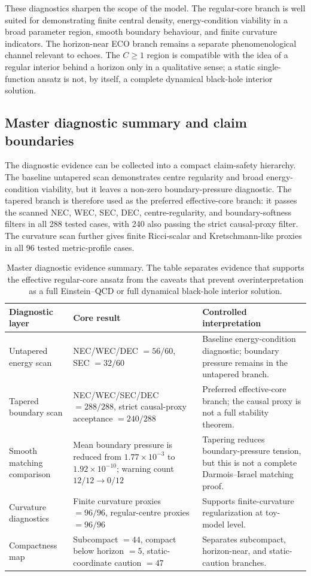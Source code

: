 \documentclass[epj]{svjour}
\begin{document}
These diagnostics sharpen the scope of the model. The regular-core branch is
well suited for demonstrating finite central density, energy-condition viability
in a broad parameter region, smooth boundary behaviour, and finite curvature
indicators. The horizon-near ECO branch remains a separate phenomenological
channel relevant to echoes. The $C\geq1$ region is compatible with the idea of a
regular interior behind a horizon only in a qualitative sense; a static
single-function ansatz is not, by itself, a complete dynamical black-hole
interior solution.


\subsection{Master diagnostic summary and claim boundaries}
\label{sec:master_diagnostic_summary}

The diagnostic evidence can be collected into a compact claim-safety hierarchy.
The baseline untapered scan demonstrates centre regularity and broad
energy-condition viability, but it leaves a non-zero boundary-pressure diagnostic.
The tapered branch is therefore used as the preferred effective-core branch: it
passes the scanned NEC, WEC, SEC, DEC, centre-regularity, and boundary-softness
filters in all 288 tested cases, with 240 also passing the strict causal-proxy
filter. The curvature scan further gives finite Ricci-scalar and
Kretschmann-like proxies in all 96 tested metric-profile cases.

\begin{table}
\centering
\caption{Master diagnostic evidence summary. The table separates evidence that
supports the effective regular-core ansatz from the caveats that prevent
overinterpretation as a full Einstein--QCD or full dynamical black-hole interior
solution.}
\label{tab:master_diagnostic_evidence}
\scriptsize
\begin{tabular}{p{}p{}p{}}
\toprule
Diagnostic layer & Core result & Controlled interpretation\\
\midrule
Untapered energy scan &
NEC/WEC/DEC $=56/60$, SEC $=32/60$ &
Baseline energy-condition diagnostic; boundary pressure remains in the
untapered branch.\\
Tapered boundary scan &
NEC/WEC/SEC/DEC $=288/288$, strict causal-proxy acceptance $=240/288$ &
Preferred effective-core branch; the causal proxy is not a full stability
theorem.\\
Smooth matching comparison &
Mean boundary pressure is reduced from $1.77\times10^{-3}$ to
$1.92\times10^{-10}$; warning count $12/12\to0/12$ &
Tapering reduces boundary-pressure tension, but this is not a complete
Darmois--Israel matching proof.\\
Curvature diagnostics &
Finite curvature proxies $=96/96$, regular-centre proxies $=96/96$ &
Supports finite-curvature regularization at toy-model level.\\
Compactness map &
Subcompact $=44$, compact below horizon $=5$, static-coordinate caution $=47$ &
Separates subcompact, horizon-near, and static-caution branches.\\
\bottomrule
\end{tabular}
\end{table}
\end{document}
